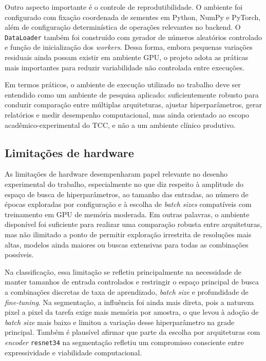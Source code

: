 \documentclass[tcc,capa]{texufpel}
\begin{document}
Outro aspecto importante é o controle de reprodutibilidade. O ambiente foi configurado com fixação coordenada de sementes em Python, NumPy e PyTorch, além de configuração determinística de operações relevantes no backend. O \texttt{DataLoader} também foi construído com gerador de números aleatórios controlado e função de inicialização dos \textit{workers}. Dessa forma, embora pequenas variações residuais ainda possam existir em ambiente GPU, o projeto adota as práticas mais importantes para reduzir variabilidade não controlada entre execuções.

Em termos práticos, o ambiente de execução utilizado no trabalho deve ser entendido como um ambiente de pesquisa aplicado: suficientemente robusto para conduzir comparação entre múltiplas arquiteturas, ajustar hiperparâmetros, gerar relatórios e medir desempenho computacional, mas ainda orientado ao escopo acadêmico-experimental do TCC, e não a um ambiente clínico produtivo.

\subsection{Limitações de hardware}

As limitações de hardware desempenharam papel relevante no desenho experimental do trabalho, especialmente no que diz respeito à amplitude do espaço de busca de hiperparâmetros, ao tamanho das entradas, ao número de épocas exploradas por configuração e à escolha de \textit{batch sizes} compatíveis com treinamento em GPU de memória moderada. Em outras palavras, o ambiente disponível foi suficiente para realizar uma comparação robusta entre arquiteturas, mas não ilimitado a ponto de permitir exploração irrestrita de resoluções mais altas, modelos ainda maiores ou buscas extensivas para todas as combinações possíveis.

Na classificação, essa limitação se refletiu principalmente na necessidade de manter tamanhos de entrada controlados e restringir o espaço principal de busca a combinações discretas de taxa de aprendizado, \textit{batch size} e profundidade de \textit{fine-tuning}. Na segmentação, a influência foi ainda mais direta, pois a natureza pixel a pixel da tarefa exige mais memória por amostra, o que levou à adoção de \textit{batch size} mais baixo e limitou a variação desse hiperparâmetro na grade principal. Também é plausível afirmar que parte da escolha por arquiteturas com \textit{encoder} \texttt{resnet34} na segmentação refletiu um compromisso consciente entre expressividade e viabilidade computacional.
\end{document}
